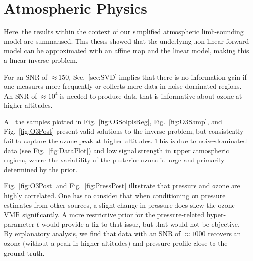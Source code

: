 \section{Atmospheric Physics}
Here, the results within the context of our simplified atmospheric limb-sounding model are summarised.
This thesis showed that the underlying non-linear forward model can be approximated with an affine map and the linear model, making this a linear inverse problem.

For an SNR of $\approx150$, Sec.~\ref{sec:SVD} implies that there is no information gain if one measures more frequently or collects more data in noise-dominated regions.
An SNR of $\approx10^4$ is needed to produce data that is informative about ozone at higher altitudes.

All the samples plotted in Fig.~\ref{fig:O3SolplsReg}, Fig.~\ref{fig:O3Samp}, and Fig.~\ref{fig:O3Post} present valid solutions to the inverse problem, but consistently fail to capture the ozone peak at higher altitudes.
This is due to noise-dominated data (see Fig.~\ref{fig:DataPlot}) and low signal strength in upper atmospheric regions, where the variability of the posterior ozone is large and primarily determined by the prior.

Fig.~\ref{fig:O3Post} and Fig.~\ref{fig:PressPost} illustrate that pressure and ozone are highly correlated.
One has to consider that when conditioning on pressure estimates from other sources, a slight change in pressure does skew the ozone VMR significantly.
A more restrictive prior for the pressure-related hyper-parameter $b$ would provide a fix to that issue, but that would not be objective.
By explanatory analysis, we find that data with an SNR of $\approx 1000$ recovers an ozone (without a peak in higher altitudes) and pressure profile close to the ground truth.

